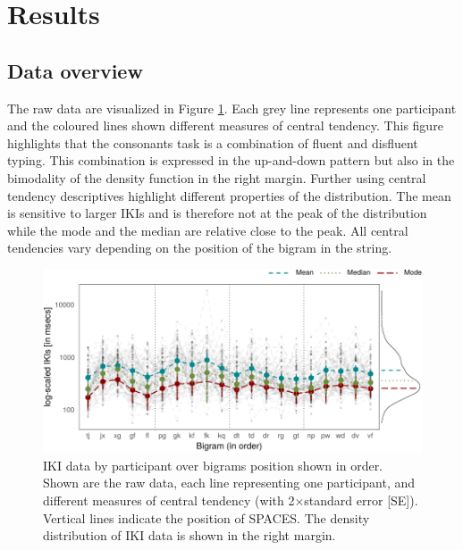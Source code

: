 \documentclass[english,jou,floatsintext]{apa7}
\begin{document}
\hypertarget{results}{%
\section{Results}\label{results}}

\hypertarget{data-overview}{%
\subsection{Data overview}\label{data-overview}}

The raw data are visualized in Figure \ref{fig:descriptives}. Each grey line represents one participant and the coloured lines shown different measures of central tendency. This figure highlights that the consonants task is a combination of fluent and disfluent typing. This combination is expressed in the up-and-down pattern but also in the bimodality of the density function in the right margin. Further using central tendency descriptives highlight different properties of the distribution. The mean is sensitive to larger IKIs and is therefore not at the peak of the distribution while the mode and the median are relative close to the peak. All central tendencies vary depending on the position of the bigram in the string.

\begin{figure}[!ht]

{\centering \includegraphics{report_files/figure-latex/descriptives-1} 

}

\caption{IKI data by participant over bigrams position shown in order. Shown are the raw data, each line representing one participant, and different measures of central tendency (with 2$\times$standard error [SE]). Vertical lines indicate the position of SPACES. The density distribution of IKI data is shown in the right margin.}\label{fig:descriptives}
\end{figure}
\end{document}
